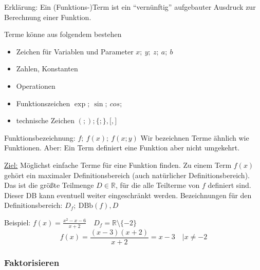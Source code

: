 Erklärung: Ein (Funktions-)Term ist ein ``vernünftig'' aufgebauter Ausdruck zur Berechnung einer Funktion.

Terme könne aus folgendem bestehen
\begin{itemize}
    \item Zeichen für Variablen und Parameter $x;\ y;\ z;\ a;\ b$
    \item Zahlen, Konstanten
    \item Operationen
    \item Funktionszeichen $\exp;\ \sin;\ cos;\ $
    \item technische Zeichen $(;);\lbrace;\rbrace,\lbrack,\rbrack$
\end{itemize}
Funktionsbezeichnung: $f;\ f(x);\ f(x;y)$ Wir bezeichnen Terme ähnlich wie Funktionen.
Aber: Ein Term definiert eine Funktion aber nicht umgekehrt.


\underline{Ziel:} Möglichst einfache Terme für eine Funktion finden.
Zu einem Term $f(x)$ gehört ein maximaler Definitionsbereich (auch natürlicher Definitionsbereich).
Das ist die größte Teilmenge $D \in \mathbb{R}$, für die alle Teilterme von $f$ definiert sind.
Dieser DB kann eventuell weiter eingeschränkt werden.
Bezeichnungen für den Definitionsbereich: $D_f;\ \textrm{DBb}(f), D$


Beispiel: $f(x) = \frac{x^2-x-6}{x+2}\quad D_f=\mathbb{R}\setminus\lbrace-2\rbrace$
\[f(x)= \frac{(x-3)(x+2)}{x+2} = x-3\quad | x \not = -2\]

\subsubsection{Faktorisieren}

